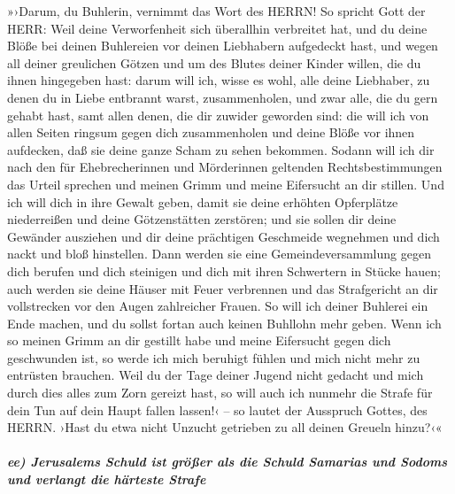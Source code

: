 »›Darum, du Buhlerin, vernimmt das Wort des HERRN!
So spricht Gott der HERR: Weil deine Verworfenheit sich
überallhin verbreitet hat, und du deine Blöße bei deinen Buhlereien vor
deinen Liebhabern aufgedeckt hast, und wegen all deiner greulichen
Götzen und um des Blutes deiner Kinder willen, die du ihnen hingegeben
hast: darum will ich, wisse es wohl, alle deine
Liebhaber, zu denen du in Liebe entbrannt warst, zusammenholen, und zwar
alle, die du gern gehabt hast, samt allen denen, die dir zuwider
geworden sind: die will ich von allen Seiten ringsum gegen dich
zusammenholen und deine Blöße vor ihnen aufdecken, daß sie deine ganze
Scham zu sehen bekommen. Sodann will ich dir nach den für
Ehebrecherinnen und Mörderinnen geltenden Rechtsbestimmungen das Urteil
sprechen und meinen Grimm und meine Eifersucht an dir stillen.
Und ich will dich in ihre Gewalt geben, damit sie deine
erhöhten Opferplätze niederreißen und deine Götzenstätten zerstören; und
sie sollen dir deine Gewänder ausziehen und dir deine prächtigen
Geschmeide wegnehmen und dich nackt und bloß hinstellen.
Dann werden sie eine Gemeindeversammlung gegen dich
berufen und dich steinigen und dich mit ihren Schwertern in Stücke
hauen; auch werden sie deine Häuser mit Feuer verbrennen
und das Strafgericht an dir vollstrecken vor den Augen zahlreicher
Frauen. So will ich deiner Buhlerei ein Ende machen, und du sollst
fortan auch keinen Buhllohn mehr geben. Wenn ich so
meinen Grimm an dir gestillt habe und meine Eifersucht gegen dich
geschwunden ist, so werde ich mich beruhigt fühlen und mich nicht mehr
zu entrüsten brauchen. Weil du der Tage deiner Jugend
nicht gedacht und mich durch dies alles zum Zorn gereizt hast, so will
auch ich nunmehr die Strafe für dein Tun auf dein Haupt fallen lassen!‹
-- so lautet der Ausspruch Gottes, des HERRN. ›Hast du etwa nicht
Unzucht getrieben zu all deinen Greueln hinzu?‹«

\hypertarget{ee-jerusalems-schuld-ist-gruxf6uxdfer-als-die-schuld-samarias-und-sodoms-und-verlangt-die-huxe4rteste-strafe}{%
\subparagraph{ee) Jerusalems Schuld ist größer als die Schuld Samarias
und Sodoms und verlangt die härteste
Strafe}\label{ee-jerusalems-schuld-ist-gruxf6uxdfer-als-die-schuld-samarias-und-sodoms-und-verlangt-die-huxe4rteste-strafe}}

